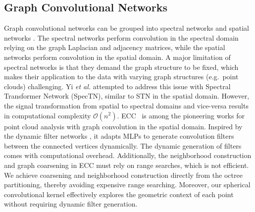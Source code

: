 \documentclass[10pt,twocolumn,letterpaper]{article}
\begin{document}
\subsection{Graph Convolutional Networks}
\vspace{-2mm}
Graph convolutional networks can be grouped into spectral networks \cite{bruna2013spectral,defferrard2016convolutional,kipf2017semi} and spatial networks \cite{simonovsky2017dynamic}. The spectral networks perform convolution in the spectral domain relying on the graph Laplacian and adjacency matrices, while the spatial networks perform convolution in the spatial domain. 
A major limitation of spectral networks is that they demand the graph structure to be fixed, which makes their application to the data with varying graph structures (e.g.~point clouds) challenging. Yi \emph{et al.} \cite{yi2017syncspeccnn} attempted to address this issue with Spectral Transformer Network (SpecTN), similar to STN \cite{jaderberg2015spatial} in the spatial domain. However, the signal transformation from spatial to spectral domains and vice-versa results in  computational complexity $\mathcal{O}(n^2)$. 
ECC~\cite{simonovsky2017dynamic} is among the pioneering works  for point cloud analysis with graph convolution in the spatial domain. Inspired by the dynamic filter networks \cite{de2016dynamic}, it adapts MLPs to generate convolution filters between the connected vertices dynamically. 
 The dynamic generation of filters comes with computational overhead. Additionally, the neighborhood construction and graph coarsening in ECC must rely on range searches, which is not efficient. We achieve  
coarsening and neighborhood construction directly from the  octree partitioning, thereby avoiding expensive range searching. Moreover, our spherical convolutional kernel effectively explores the geometric context of each point without requiring dynamic filter generation.


\vspace{-1mm}
\end{document}
